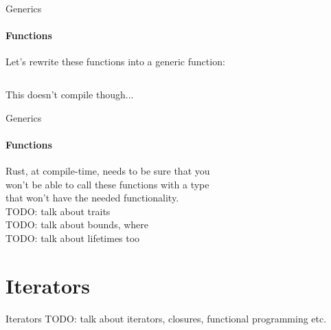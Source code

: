 \documentclass[usenames,dvipsnames,10pt,aspectratio=169]{beamer}
\begin{document}
\begin{frame}{Generics}
	\framesubtitle{Functions}
	\large
	Let's rewrite these functions into a generic function:\\
	\vspace{0.2cm}
	\inputminted[fontsize=\Large]{rust}{code/generics5.rs}
	\vspace{0.2cm}
	This doesn't compile though...\\
\end{frame}

\begin{frame}{Generics}
	\framesubtitle{Functions}
	\large
	Rust, at compile-time, needs to be sure that you\\
	won't be able to call these functions with a type\\
	that won't have the needed functionality.\\
	\textcolor{ucured}{TODO: talk about traits}\\
	\textcolor{ucured}{TODO: talk about bounds, where}\\
	\textcolor{ucured}{TODO: talk about lifetimes too}
\end{frame}	


\section{Iterators}

\begin{frame}{Iterators}
	\large
	\textcolor{ucured}{TODO: talk about iterators, closures, functional programming etc.}
	
\end{frame}
 

\end{document}
